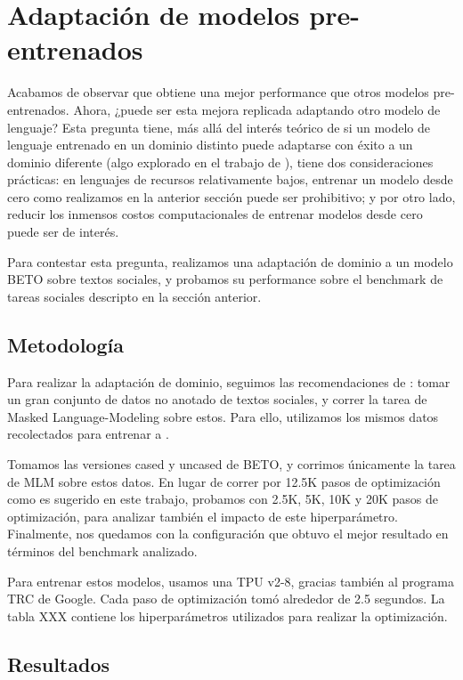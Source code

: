 \section{Adaptación de modelos pre-entrenados}

Acabamos de observar que \robertuito{} obtiene una mejor performance que otros modelos pre-entrenados. Ahora, ¿puede ser esta mejora replicada adaptando otro modelo de lenguaje? Esta pregunta tiene, más allá del interés teórico de si un modelo de lenguaje entrenado en un dominio distinto puede adaptarse con éxito a un dominio diferente (algo explorado en el trabajo de \citet{gururangan-etal-2020-dont}), tiene dos consideraciones prácticas: en lenguajes de recursos relativamente bajos, entrenar un modelo desde cero como realizamos en la anterior sección puede ser prohibitivo; y por otro lado, reducir los inmensos costos computacionales de entrenar modelos desde cero puede ser de interés.

Para contestar esta pregunta, realizamos una adaptación de dominio a un modelo BETO sobre textos sociales, y probamos su performance sobre el benchmark de tareas sociales descripto en la sección anterior.


\subsection{Metodología}

Para realizar la adaptación de dominio, seguimos las recomendaciones de \citet{gururangan-etal-2020-dont}: tomar un gran conjunto de datos no anotado de textos sociales, y correr la tarea de Masked Language-Modeling sobre estos. Para ello, utilizamos los mismos datos recolectados para entrenar a \robertuito{}.

Tomamos las versiones cased y uncased de BETO, y corrimos únicamente la tarea de MLM sobre estos datos. En lugar de correr por 12.5K pasos de optimización como es sugerido en este trabajo, probamos con 2.5K, 5K, 10K y 20K pasos de optimización, para analizar también el impacto de este hiperparámetro. Finalmente, nos quedamos con la configuración que obtuvo el mejor resultado en términos del benchmark analizado.

Para entrenar estos modelos, usamos una TPU v2-8, gracias también al programa TRC de Google. Cada paso de optimización tomó alrededor de 2.5 segundos. La tabla XXX contiene los hiperparámetros utilizados para realizar la optimización.

\subsection{Resultados}

